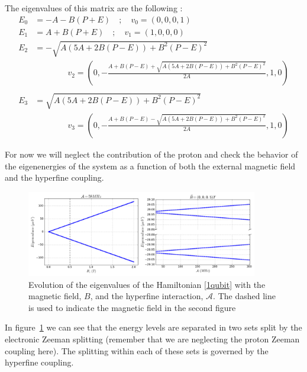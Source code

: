The eigenvalues of this matrix are the following :
\begin{equation}
  \begin{split}
    E_0 &= -A-B(P+E) \quad;\quad v_0=\left(0,0,0,1\right)\\
    E_1 &= A+B(P+E) \quad;\quad v_1=\left(1,0,0,0\right)\\
    E_2 &= -\sqrt{A(5A+2B(P-E)) + B^2 (P-E)^2} \\
        &\quad\quad\quad\quad v_2 =\left(0,-\frac{A+B(P-E)+\sqrt{A(5A+2B(P-E)) + B^2 (P-E)^2}}{2 A},1,0\right)\\
    \quad\\
    E_3 &= \sqrt{A(5A+2B(P-E)) + B^2 (P-E)^2}\\
        &\quad\quad\quad\quad v_3 = \left(0,-\frac{A+B(P-E)-\sqrt{A(5A+2B(P-E)) + B^2 (P-E)^2}}{2 A},1,0\right)
  \end{split}
\label{eig}
\end{equation}



For now we will neglect the contribution of the proton and check the behavior of the eigenenergies of the system as a function of both the external magnetic field and the hyperfine coupling.
\begin{figure}[h!]
\centering
\includegraphics[width=0.9\textwidth]{chapter03/figures/spectrum.png}
\vspace{-5pt}
\caption{Evolution of the eigenvalues of the Hamiltonian \eqref{1qubit} with the magnetic field, $B$, and the hyperfine interaction, $\mathcal{A}$. The dashed line is used to indicate the magnetic field in the second figure}
\label{spectrum}
\end{figure}
\FloatBarrier
In figure~\ref{spectrum} we can see that the energy levels are separated in two sets split by the electronic Zeeman splitting (remember that we are neglecting the proton Zeeman coupling here). The splitting within each of these sets is governed by the hyperfine coupling.


